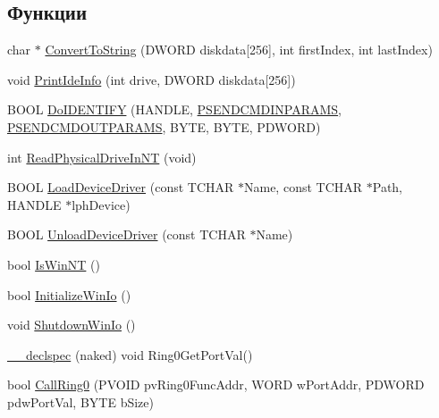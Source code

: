 \subsection*{Функции}
\begin{DoxyCompactItemize}
\item 
char $\ast$ \hyperlink{namespacednp__checkout_a9a2a91cefbe3ab9d3e6eb4742cae5a81}{Convert\-To\-String} (D\-W\-O\-R\-D diskdata\mbox{[}256\mbox{]}, int first\-Index, int last\-Index)
\item 
void \hyperlink{namespacednp__checkout_ac24dde3a6c09af4a3efdbfaebc1bc16d}{Print\-Ide\-Info} (int drive, D\-W\-O\-R\-D diskdata\mbox{[}256\mbox{]})
\item 
B\-O\-O\-L \hyperlink{namespacednp__checkout_a68fe2bb282688f66c6c600f617657d3d}{Do\-I\-D\-E\-N\-T\-I\-F\-Y} (H\-A\-N\-D\-L\-E, \hyperlink{namespacednp__checkout_a9a258707ab31e1440dc4dda9384d454e}{P\-S\-E\-N\-D\-C\-M\-D\-I\-N\-P\-A\-R\-A\-M\-S}, \hyperlink{namespacednp__checkout_acea691d4d3e0a27a9a60cf36e2767942}{P\-S\-E\-N\-D\-C\-M\-D\-O\-U\-T\-P\-A\-R\-A\-M\-S}, B\-Y\-T\-E, B\-Y\-T\-E, P\-D\-W\-O\-R\-D)
\item 
int \hyperlink{namespacednp__checkout_a99e90af706ccac491114dc870efbbded}{Read\-Physical\-Drive\-In\-N\-T} (void)
\item 
B\-O\-O\-L \hyperlink{namespacednp__checkout_a78762067149b06ccf8840970caf2e7ac}{Load\-Device\-Driver} (const T\-C\-H\-A\-R $\ast$Name, const T\-C\-H\-A\-R $\ast$Path, H\-A\-N\-D\-L\-E $\ast$lph\-Device)
\item 
B\-O\-O\-L \hyperlink{namespacednp__checkout_a2d5f6cc36b7ebc7d3a62ec8ab9a51c96}{Unload\-Device\-Driver} (const T\-C\-H\-A\-R $\ast$Name)
\item 
bool \hyperlink{namespacednp__checkout_a4f513cc9ab0f701ffc5ee9022e7ef854}{Is\-Win\-N\-T} ()
\item 
bool \hyperlink{namespacednp__checkout_aacf441fa91dc5ee3101abc898e8feeed}{Initialize\-Win\-Io} ()
\item 
void \hyperlink{namespacednp__checkout_a3b733da53de993806dcaf0cf8926d203}{Shutdown\-Win\-Io} ()
\item 
\hyperlink{namespacednp__checkout_a1790725dae4857814b68bad6b19ed96b}{\-\_\-\-\_\-declspec} (naked) void Ring0\-Get\-Port\-Val()
\item 
bool \hyperlink{namespacednp__checkout_a0e04118334eb66a710e076231f7967b1}{Call\-Ring0} (P\-V\-O\-I\-D pv\-Ring0\-Func\-Addr, W\-O\-R\-D w\-Port\-Addr, P\-D\-W\-O\-R\-D pdw\-Port\-Val, B\-Y\-T\-E b\-Size)
\item 

\end{DoxyCompactItemize}
